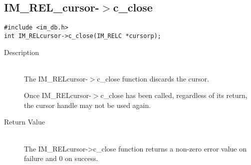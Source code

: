 \documentclass[11pt]{article}
\def\cdf{\sf }
\def\cdf{\sf }
\newcommand{\IMRELcursor}{{\small{\cdf IM\_REL\_cursor}}}
\begin{document}
\newpage
\subsection{{\IMRELcursor}-$>$c\_close}
\begin{verbatim}
#include <im_db.h>
int IM_RELcursor->c_close(IM_RELC *cursorp);
\end{verbatim}
\begin{description}
\item[Description]\ \\

  The IM\_RELcursor-$>$c\_close function discards the cursor. 

  Once IM\_RELcursor-$>$c\_close has been called, regardless of its
  return, the cursor handle may not be used again. 

\item[Return Value]\ \\
  The IM\_RELcursor->c\_close function returns a non-zero error value
  on failure and 0 on success.
\end{description}

\newpage
\tableofcontents
\end{document}

